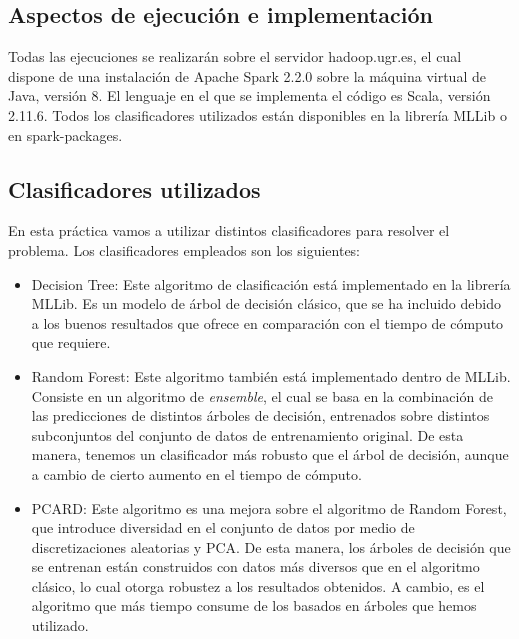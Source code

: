 \documentclass[
  a4paper,
,tablecaptionabove
]{scrartcl}
\providecommand{\tightlist}{%
  \setlength{\itemsep}{0pt}\setlength{\parskip}{0pt}}
\begin{document}
\hypertarget{aspectos-de-ejecuciuxf3n-e-implementaciuxf3n}{%
\subsection{Aspectos de ejecución e
implementación}\label{aspectos-de-ejecuciuxf3n-e-implementaciuxf3n}}

Todas las ejecuciones se realizarán sobre el servidor hadoop.ugr.es, el
cual dispone de una instalación de Apache Spark 2.2.0 sobre la máquina
virtual de Java, versión 8. El lenguaje en el que se implementa el
código es Scala, versión 2.11.6. Todos los clasificadores utilizados
están disponibles en la librería MLLib o en spark-packages.

\hypertarget{clasificadores-utilizados}{%
\subsection{Clasificadores utilizados}\label{clasificadores-utilizados}}

En esta práctica vamos a utilizar distintos clasificadores para resolver
el problema. Los clasificadores empleados son los siguientes:

\begin{itemize}
\tightlist
\item
  Decision Tree: Este algoritmo de clasificación está implementado en la
  librería MLLib. Es un modelo de árbol de decisión clásico, que se ha
  incluido debido a los buenos resultados que ofrece en comparación con
  el tiempo de cómputo que requiere.
\item
  Random Forest: Este algoritmo también está implementado dentro de
  MLLib. Consiste en un algoritmo de \emph{ensemble}, el cual se basa en
  la combinación de las predicciones de distintos árboles de decisión,
  entrenados sobre distintos subconjuntos del conjunto de datos de
  entrenamiento original. De esta manera, tenemos un clasificador más
  robusto que el árbol de decisión, aunque a cambio de cierto aumento en
  el tiempo de cómputo.
\item
  PCARD: Este algoritmo es una mejora sobre el algoritmo de Random
  Forest, que introduce diversidad en el conjunto de datos por medio de
  discretizaciones aleatorias y PCA. De esta manera, los árboles de
  decisión que se entrenan están construidos con datos más diversos que
  en el algoritmo clásico, lo cual otorga robustez a los resultados
  obtenidos. A cambio, es el algoritmo que más tiempo consume de los
  basados en árboles que hemos utilizado.
\end{itemize}
\end{document}
